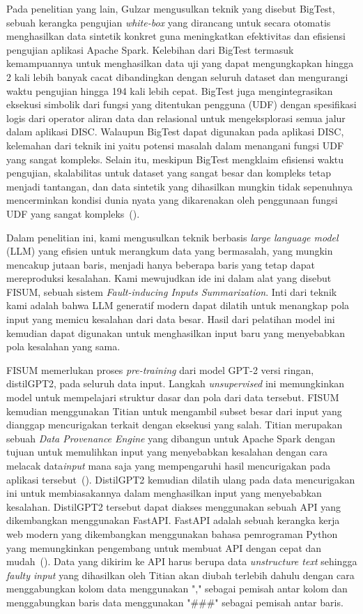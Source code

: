 Pada penelitian yang lain, Gulzar mengusulkan teknik yang disebut 
BigTest, sebuah kerangka pengujian \emph{white-box} yang dirancang untuk 
secara otomatis menghasilkan data sintetik konkret guna meningkatkan 
efektivitas dan efisiensi pengujian aplikasi Apache Spark. 
Kelebihan dari BigTest termasuk kemampuannya untuk menghasilkan 
data uji yang dapat mengungkapkan hingga 2 kali lebih banyak cacat 
dibandingkan dengan seluruh dataset dan mengurangi waktu pengujian 
hingga 194 kali lebih cepat. BigTest juga mengintegrasikan eksekusi 
simbolik dari fungsi yang ditentukan pengguna (UDF) dengan 
spesifikasi logis dari operator aliran data dan relasional 
untuk mengeksplorasi semua jalur dalam aplikasi DISC. 
Walaupun BigTest dapat digunakan pada aplikasi DISC, 
kelemahan dari teknik ini yaitu potensi masalah dalam 
menangani fungsi UDF yang sangat kompleks. Selain itu, meskipun 
BigTest mengklaim efisiensi waktu pengujian, skalabilitas untuk 
dataset yang sangat besar dan kompleks tetap menjadi tantangan, 
dan data sintetik yang dihasilkan mungkin tidak sepenuhnya 
mencerminkan kondisi dunia nyata yang dikarenakan oleh
penggunaan fungsi UDF yang sangat kompleks~(\cite{gulzar2020}).


Dalam penelitian ini, kami mengusulkan teknik berbasis 
\emph{large language model} (LLM) yang efisien untuk 
merangkum data yang bermasalah, yang mungkin mencakup 
jutaan baris, menjadi hanya beberapa baris yang tetap 
dapat mereproduksi kesalahan. Kami mewujudkan ide ini 
dalam alat yang disebut FISUM, sebuah sistem 
\emph{Fault-inducing Inputs Summarization}. 
Inti dari teknik kami adalah bahwa LLM generatif 
modern dapat dilatih untuk menangkap pola input 
yang memicu kesalahan dari data besar. Hasil dari 
pelatihan model ini kemudian dapat digunakan untuk 
menghasilkan input baru yang menyebabkan pola 
kesalahan yang sama.

FISUM memerlukan proses \emph{pre-training} 
dari model GPT-2 versi ringan, distilGPT2, pada seluruh 
data input. Langkah \emph{unsupervised} ini 
memungkinkan model untuk mempelajari struktur 
dasar dan pola dari data tersebut. FISUM kemudian 
menggunakan Titian untuk mengambil subset besar 
dari input yang dianggap mencurigakan terkait 
dengan eksekusi yang salah. Titian merupakan sebuah 
\textit{Data Provenance Engine} 
yang dibangun untuk Apache Spark dengan tujuan untuk memulihkan input yang 
menyebabkan kesalahan dengan cara melacak data\emph{input} mana 
saja yang mempengaruhi hasil mencurigakan 
pada aplikasi tersebut~(\cite{interlandi2015}).
DistilGPT2 kemudian 
dilatih ulang pada data mencurigakan ini untuk 
membiasakannya dalam menghasilkan input yang 
menyebabkan kesalahan. DistilGPT2 tersebut dapat diakses menggunakan
sebuah API yang dikembangkan menggunakan FastAPI. 
FastAPI adalah sebuah kerangka kerja web modern yang
dikembangkan menggunakan bahasa pemrograman Python
yang memungkinkan pengembang untuk membuat API
dengan cepat dan mudah~(\cite{fastapi}). Data yang dikirim ke API
harus berupa data \emph{unstructure text} sehingga
\emph{faulty input} yang dihasilkan oleh Titian akan diubah terlebih dahulu
dengan cara menggabungkan kolom data menggunakan "," sebagai
pemisah antar kolom dan menggabungkan baris data menggunakan
"\#\#\#" sebagai pemisah antar baris.

